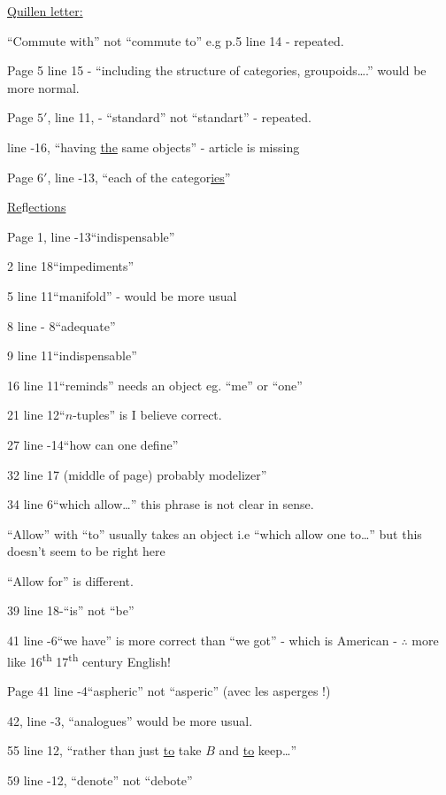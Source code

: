\uline{Quillen letter:}

``Commute with'' not ``commute to'' e.g p.5 line 14 - repeated.

Page 5 line 15 - ``including the structure of categories, groupoids\ldots.'' would be more normal.

Page $5'$, line 11, - ``standard'' not ``standart'' - repeated.

line -16, ``having \uline{the} same objects'' - article is missing

Page $6'$, line -13, ``each of the categor\uline{ies}''

\uline{Re}fl\uline{ections}

Page 1, line -13\quad ``indispensable''

2 line 18\quad ``impediments''

5 line 11\quad ``manifold'' - would be more usual

8 line - 8\quad ``adequate''

9 line 11\quad ``indispensable''

16 line 11\quad ``reminds'' needs an object eg. ``me'' or ``one''

21 line 12\quad ``$n$-tuples'' is I believe correct.

27 line -14\quad ``how can one define''

32 line 17 (middle of page) probably modelizer''

34 line 6\quad ``which allow\ldots'' this phrase is not clear in sense.

``Allow'' with ``to'' usually takes an object i.e ``which allow one to\ldots'' but this doesn't seem to be right here

``Allow for'' is different.

39 line 18-``is'' not ``be''

41 line -6\quad ``we have'' is more correct than ``we got'' - which is American - $\therefore$ more like 16\textsuperscript{th}  17\textsuperscript{th} century English!

Page 41 \unsure{-}line -4\quad ``aspheric'' not ``asperic'' (avec\unsure{,|-} les asperges !)

42, line -3, ``analogues'' would be more usual.

55 line 12, ``rather than just \uline{to} take $B$ and \uline{to} keep\ldots''

59 line -12, ``denote'' not ``debote''


